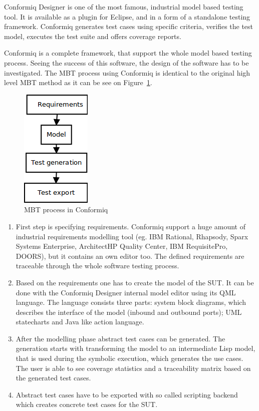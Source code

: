 Conformiq Designer is one of the most famous, industrial model based testing tool. It is available as a plugin for Eclipse, and in a form of a standalone testing framework. Conformiq generates test cases using specific criteria, verifies the test model, executes the test suite and offers coverage reports.

Conformiq is a complete framework, that support the whole model based testing process. Seeing the success of this software, the design of the software has to be investigated. The MBT process using Conformiq is identical to the original high level MBT method as it can be see on Figure~\ref{fig:conformiq_process}.

\begin{figure}[htp]
\centering
\includegraphics[scale=0.6]{figures/conformiq_process.png}
\caption{MBT process in Conformiq}
\label{fig:conformiq_process}
\end{figure}

\begin{enumerate}
	\item First step is specifying requirements. Conformiq support a huge amount of industrial requirements modelling tool (eg. IBM Rational, Rhapsody, Sparx Systems Enterprise, ArchitectHP Quality Center, IBM RequisitePro, DOORS), but it contains an own editor too. The defined requirements are traceable through the whole software testing process.
	\item Based on the requirements one has to create the model of the SUT. It can be done with the Conformiq Designer internal model editor using its QML language. The language consists three parts: system block diagrams, which describes the interface of the model (inbound and outbound ports); UML statecharts and Java like action language.
	\item After the modelling phase abstract test cases can be generated. The generation starts with transforming the model to an intermediate Lisp model, that is used during the symbolic execution, which generates the use cases. The user is able to see coverage statistics and a traceability matrix based on the generated test cases.
	\item Abstract test cases have to be exported with so called scripting backend which creates concrete test cases for the SUT.
\end{enumerate}

